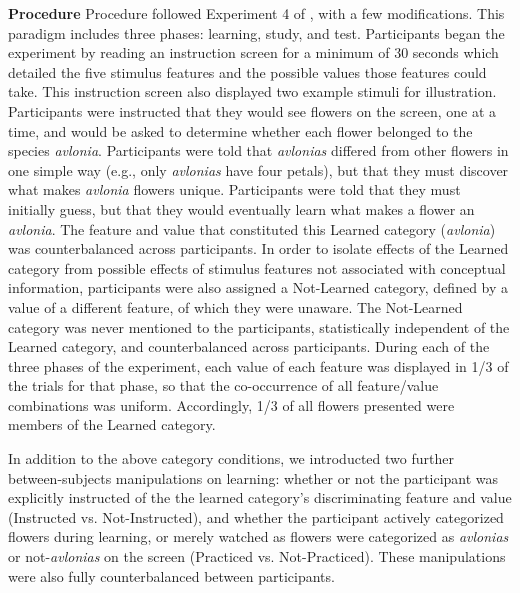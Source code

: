 \documentclass[twocolumn]{svjour3}          %
\begin{document}
\noindent\textbf{Procedure }
Procedure followed Experiment 4 of \citet{DeBrigard2017}, with a few
modifications. This paradigm includes three phases: learning, study,
and test. Participants began the experiment by reading an instruction
screen for a minimum of 30 seconds which detailed the five stimulus
features and the possible values those features could take. This
instruction screen also displayed two example stimuli for
illustration. Participants were instructed that they would see flowers
on the screen, one at a time, and would be asked to determine whether
each flower belonged to the species \emph{avlonia}.  Participants were
told that \emph{avlonias} differed from other flowers in one simple
way (e.g., only \emph{avlonias} have four petals), but that they must
discover what makes \emph{avlonia} flowers unique. Participants were
told that they must initially guess, but that they would eventually
learn what makes a flower an \emph{avlonia}. The feature and value
that constituted this Learned category (\emph{avlonia}) was
counterbalanced across participants. In order to isolate effects of
the Learned category from possible effects of stimulus features not
associated with conceptual information, participants were also
assigned a Not-Learned category, defined by a value of a different
feature, of which they were unaware. The Not-Learned category was
never mentioned to the participants, statistically independent of the
Learned category, and counterbalanced across participants. During each
of the three phases of the experiment, each value of each feature was
displayed in 1/3 of the trials for that phase, so that the
co-occurrence of all feature/value combinations was
uniform. Accordingly, 1/3 of all flowers presented were members of the
Learned category.

In addition to the above category conditions, we introducted two
further between-subjects manipulations on learning: whether or not the
participant was explicitly instructed of the the learned category's
discriminating feature and value (Instructed vs. Not-Instructed), and
whether the participant actively categorized flowers during learning,
or merely watched as flowers were categorized as \emph{avlonias} or
not-\emph{avlonias} on the screen (Practiced vs. Not-Practiced). These
manipulations were also fully counterbalanced between participants.
\end{document}
